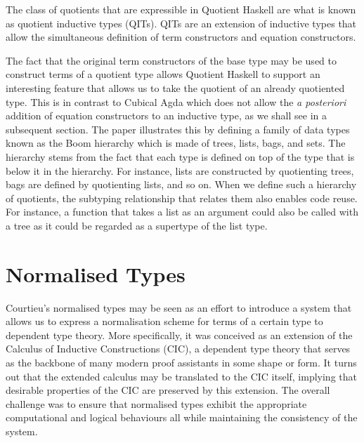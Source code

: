 \documentclass[12pt,twoside,maitrise]{dms}
\theoremstyle{definition}
\numberwithin{equation}{section}
\numberwithin{table}{chapter}
\numberwithin{figure}{chapter}
\newcommand\latinphrase{\textit}
\begin{document}
The class of quotients that are expressible in Quotient Haskell are what is
known as quotient inductive types (QITs)\cite{fiore2022quotients, HoTTbook}.
QITs are an extension of inductive types that allow the simultaneous definition
of term constructors and equation constructors.

The fact that the original term constructors of the base type may be used to
construct terms of a quotient type allows Quotient Haskell to support an
interesting feature that allows us to take the quotient of an already quotiented
type. This is in contrast to Cubical Agda which does not allow the
\latinphrase{a posteriori} addition of equation constructors to an inductive
type, as we shall see in a subsequent section. The paper illustrates this by
defining a family of data types known as the Boom
hierarchy\cite{meertens1986algorithmics} which is made of trees, lists, bags,
and sets. The hierarchy stems from the fact that each type is defined on top of
the type that is below it in the hierarchy. For instance, lists are constructed
by quotienting trees, bags are defined by quotienting lists, and so on. When we
define such a hierarchy of quotients, the subtyping relationship that relates
them also enables code reuse. For instance, a function that takes a list as an
argument could also be called with a tree as it could be regarded as a supertype
of the list type.

\section{Normalised Types}\label{sec:normalised-types-courtieu}

Courtieu's normalised types\cite{courtieu-normalizedtypes} may be seen as an
effort to introduce a system that allows us to express a normalisation scheme
for terms of a certain type to dependent type theory. More specifically,
it was conceived as an extension of the Calculus of Inductive Constructions
(CIC)\cite{werner-cic}, a dependent type theory that serves as the backbone of
many modern proof assistants in some shape or form. It turns out that the
extended calculus may be translated to the CIC itself, implying that desirable
properties of the CIC are preserved by this extension. The overall challenge was
to ensure that normalised types exhibit the appropriate computational and
logical behaviours all while maintaining the consistency of the system.
\end{document}
